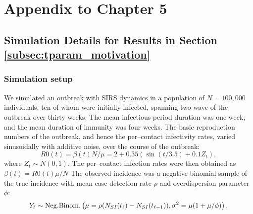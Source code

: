 \chapter{Appendix to Chapter 5}
\label{chap:appendix_ch5}

\section{Simulation Details for Results in Section \ref{subsec:tparam_motivation}}
\label{sec:tparam_motiv_details}

\subsection{Simulation setup}
\label{subsec:tparam_motiv_setup}

We simulated an outbreak with SIRS dynamics in a population of $ N= 100,000$ individuals, ten of whom were initially infected, spanning two wave of the outbreak over thirty weeks. The mean infectious period duration was one week, and the mean duration of immunity was four weeks. The basic reproduction numbers of the outbreak, and hence the per--contact infectivity rates, varied sinusoidally with additive noise, over the course of the outbreak:
\begin{equation}
\label{eqn:sinfoi_true_R0t}
R0(t) = \beta(t) N / \mu = 2 + 0.35(\sin(t / 3.5) + 0.1Z_t),
\end{equation} 
where $ Z_t \sim N(0,1)$. The per--contact infection rates were then obtained as $ \beta(t) = R0(t) \mu / N $ The observed incidence was a negative binomial sample of the true incidence with mean case detection rate $ \rho $ and overdispersion parameter $ \phi $: 
\begin{equation}
Y_\ell \sim \mathrm{Neg.Binom.}\left (\mu  = \rho(N_{SI}(t_\ell) - N_{SI}(t_{\ell-1})), \sigma^2 = \mu(1 + \mu /\phi) \right ).
\end{equation}

